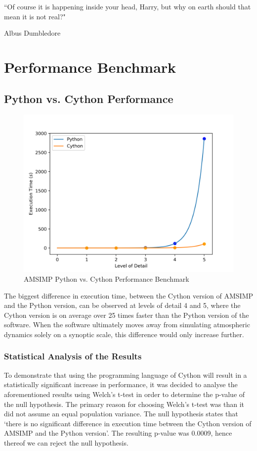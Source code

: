 \epigraph{``Of course it is happening inside your head, Harry, but why on earth should that mean it is not real?"}{Albus Dumbledore}

\section{Performance Benchmark}
\subsection{Python vs. Cython Performance}
\begin{figure}[H]
    \centering
    \includegraphics[width=.8\linewidth]{Graphs/python_vs_cython.png}
    \caption{AMSIMP Python vs. Cython Performance Benchmark}
    \label{python_vs_cython}
\end{figure}

The biggest difference in execution time, between the Cython version of AMSIMP and the Python version, can be observed at levels of detail 4 and 5, where the Cython version is on average over 25 times faster than the Python version of the software. When the software ultimately moves away from simulating atmospheric dynamics solely on a synoptic scale, this difference would only increase further.

\subsubsection{Statistical Analysis of the Results}
To demonstrate that using the programming language of Cython will result in a statistically significant increase in performance, it was decided to analyse the aforementioned results using Welch's t-test in order to determine the p-value of the null hypothesis. The primary reason for choosing Welch's t-test was than it did not assume an equal population variance. The null hypothesis states that `there is no significant difference in execution time between the Cython version of AMSIMP and the Python version'. The resulting p-value was 0.0009, hence thereof we can reject the null hypothesis. 

